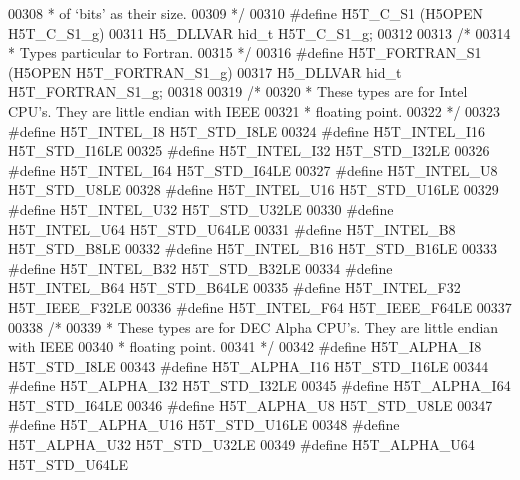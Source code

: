 \begin{DoxyCode}
00308 \textcolor{comment}{ * of `bits' as their size.}
00309 \textcolor{comment}{ */}
00310 \textcolor{preprocessor}{#define H5T\_C\_S1        (H5OPEN H5T\_C\_S1\_g)}
00311 H5\_DLLVAR hid\_t H5T\_C\_S1\_g;
00312 
00313 \textcolor{comment}{/*}
00314 \textcolor{comment}{ * Types particular to Fortran.}
00315 \textcolor{comment}{ */}
00316 \textcolor{preprocessor}{#define H5T\_FORTRAN\_S1      (H5OPEN H5T\_FORTRAN\_S1\_g)}
00317 H5\_DLLVAR hid\_t H5T\_FORTRAN\_S1\_g;
00318 
00319 \textcolor{comment}{/*}
00320 \textcolor{comment}{ * These types are for Intel CPU's.  They are little endian with IEEE}
00321 \textcolor{comment}{ * floating point.}
00322 \textcolor{comment}{ */}
00323 \textcolor{preprocessor}{#define H5T\_INTEL\_I8        H5T\_STD\_I8LE}
00324 \textcolor{preprocessor}{#define H5T\_INTEL\_I16       H5T\_STD\_I16LE}
00325 \textcolor{preprocessor}{#define H5T\_INTEL\_I32       H5T\_STD\_I32LE}
00326 \textcolor{preprocessor}{#define H5T\_INTEL\_I64       H5T\_STD\_I64LE}
00327 \textcolor{preprocessor}{#define H5T\_INTEL\_U8        H5T\_STD\_U8LE}
00328 \textcolor{preprocessor}{#define H5T\_INTEL\_U16       H5T\_STD\_U16LE}
00329 \textcolor{preprocessor}{#define H5T\_INTEL\_U32       H5T\_STD\_U32LE}
00330 \textcolor{preprocessor}{#define H5T\_INTEL\_U64       H5T\_STD\_U64LE}
00331 \textcolor{preprocessor}{#define H5T\_INTEL\_B8        H5T\_STD\_B8LE}
00332 \textcolor{preprocessor}{#define H5T\_INTEL\_B16       H5T\_STD\_B16LE}
00333 \textcolor{preprocessor}{#define H5T\_INTEL\_B32       H5T\_STD\_B32LE}
00334 \textcolor{preprocessor}{#define H5T\_INTEL\_B64       H5T\_STD\_B64LE}
00335 \textcolor{preprocessor}{#define H5T\_INTEL\_F32       H5T\_IEEE\_F32LE}
00336 \textcolor{preprocessor}{#define H5T\_INTEL\_F64       H5T\_IEEE\_F64LE}
00337 
00338 \textcolor{comment}{/*}
00339 \textcolor{comment}{ * These types are for DEC Alpha CPU's.  They are little endian with IEEE}
00340 \textcolor{comment}{ * floating point.}
00341 \textcolor{comment}{ */}
00342 \textcolor{preprocessor}{#define H5T\_ALPHA\_I8        H5T\_STD\_I8LE}
00343 \textcolor{preprocessor}{#define H5T\_ALPHA\_I16       H5T\_STD\_I16LE}
00344 \textcolor{preprocessor}{#define H5T\_ALPHA\_I32       H5T\_STD\_I32LE}
00345 \textcolor{preprocessor}{#define H5T\_ALPHA\_I64       H5T\_STD\_I64LE}
00346 \textcolor{preprocessor}{#define H5T\_ALPHA\_U8        H5T\_STD\_U8LE}
00347 \textcolor{preprocessor}{#define H5T\_ALPHA\_U16       H5T\_STD\_U16LE}
00348 \textcolor{preprocessor}{#define H5T\_ALPHA\_U32       H5T\_STD\_U32LE}
00349 \textcolor{preprocessor}{#define H5T\_ALPHA\_U64       H5T\_STD\_U64LE}

\end{DoxyCode}
